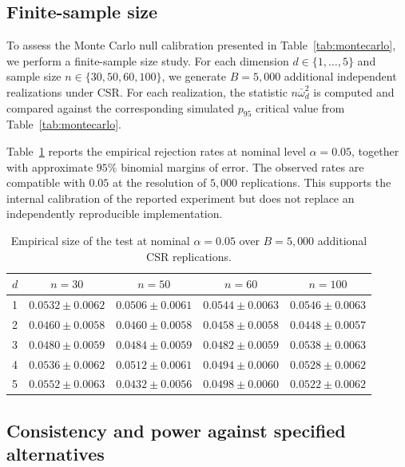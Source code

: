 \documentclass[pdflatex]{sn-jnl}
\theoremstyle{thmstyleone}
\theoremstyle{thmstyletwo}
\theoremstyle{thmstylethree}
\begin{document}
\subsection{Finite-sample size}\label{sec:size}

To assess the Monte Carlo null calibration presented in Table~\ref{tab:montecarlo}, we perform a finite-sample size study. For each dimension $d \in \{1,\dots,5\}$ and sample size $n \in \{30,50,60,100\}$, we generate $B = 5{,}000$ additional independent realizations under CSR. For each realization, the statistic $n\bar\omega^2_d$ is computed and compared against the corresponding simulated $p_{95}$ critical value from Table~\ref{tab:montecarlo}.

Table~\ref{tab:size} reports the empirical rejection rates at nominal level $\alpha=0.05$, together with approximate $95\%$ binomial margins of error. The observed rates are compatible with $0.05$ at the resolution of $5{,}000$ replications. This supports the internal calibration of the reported experiment but does not replace an independently reproducible implementation.

\begin{table}[htbp]
\caption{Empirical size of the test at nominal $\alpha = 0.05$ over $B = 5{,}000$ additional CSR replications.}\label{tab:size}
\begin{tabular*}{\textwidth}{@{\extracolsep\fill}lcccc}
\toprule
$d$ & $n=30$ & $n=50$ & $n=60$ & $n=100$ \\
\midrule
1 & $0.0532 \pm 0.0062$ & $0.0506 \pm 0.0061$ & $0.0544 \pm 0.0063$ & $0.0546 \pm 0.0063$ \\
2 & $0.0460 \pm 0.0058$ & $0.0460 \pm 0.0058$ & $0.0458 \pm 0.0058$ & $0.0448 \pm 0.0057$ \\
3 & $0.0480 \pm 0.0059$ & $0.0484 \pm 0.0059$ & $0.0482 \pm 0.0059$ & $0.0538 \pm 0.0063$ \\
4 & $0.0536 \pm 0.0062$ & $0.0512 \pm 0.0061$ & $0.0494 \pm 0.0060$ & $0.0528 \pm 0.0062$ \\
5 & $0.0552 \pm 0.0063$ & $0.0432 \pm 0.0056$ & $0.0498 \pm 0.0060$ & $0.0522 \pm 0.0062$ \\
\bottomrule
\end{tabular*}
\end{table}

\subsection{Consistency and power against specified alternatives}\label{sec:consistency}
\end{document}
